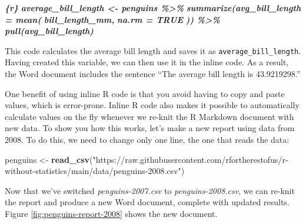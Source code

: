 \documentclass[
]{book}
\newenvironment{Shaded}{\begin{snugshade}}{\end{snugshade}}
\newcommand{\FunctionTok}[1]{\textcolor[rgb]{0.13,0.29,0.53}{\textbf{#1}}}
\newcommand{\InformationTok}[1]{\textcolor[rgb]{0.56,0.35,0.01}{\textbf{\textit{#1}}}}
\newcommand{\NormalTok}[1]{#1}
\newcommand{\OtherTok}[1]{\textcolor[rgb]{0.56,0.35,0.01}{#1}}
\newcommand{\StringTok}[1]{\textcolor[rgb]{0.31,0.60,0.02}{#1}}
\begin{document}
\begin{Shaded}
\begin{Highlighting}[]
\InformationTok{\textasciigrave{}\textasciigrave{}\textasciigrave{}\{r\}}
\InformationTok{average\_bill\_length \textless{}{-} penguins \%\textgreater{}\%}
\InformationTok{  summarize(avg\_bill\_length = mean(}
\InformationTok{    bill\_length\_mm,}
\InformationTok{    na.rm = TRUE}
\InformationTok{  )) \%\textgreater{}\%}
\InformationTok{  pull(avg\_bill\_length)}
\InformationTok{\textasciigrave{}\textasciigrave{}\textasciigrave{}}
\end{Highlighting}
\end{Shaded}

This code calculates the average bill length and saves it as \texttt{average\_bill\_length}. Having created this variable, we can then use it in the inline code. As a result, the Word document includes the sentence ``The average bill length is 43.9219298.''

One benefit of using inline R code is that you avoid having to copy and paste values, which is error-prone. Inline R code also makes it possible to automatically calculate values on the fly whenever we re-knit the R Markdown document with new data. To show you how this works, let's make a new report using data from 2008. To do this, we need to change only one line, the one that reads the data:

\begin{Shaded}
\begin{Highlighting}[]
\NormalTok{penguins }\OtherTok{\textless{}{-}} \FunctionTok{read\_csv}\NormalTok{(}\StringTok{"https://raw.githubusercontent.com/rfortherestofus/r{-}without{-}statistics/main/data/penguins{-}2008.csv"}\NormalTok{)}
\end{Highlighting}
\end{Shaded}

Now that we've switched \emph{penguins-2007.csv} to \emph{penguins-2008.csv}, we can re-knit the report and produce a new Word document, complete with updated results. Figure \ref{fig:penguins-report-2008} shows the new document.
\end{document}
